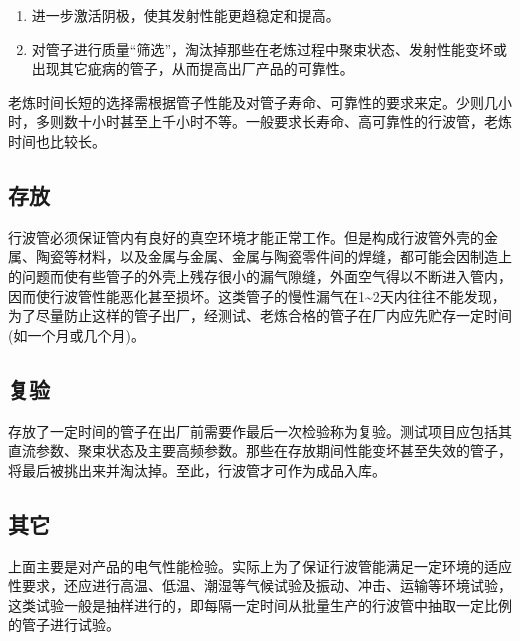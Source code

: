 \begin{enumerate}
	\item 进一步激活阴极，使其发射性能更趋稳定和提高。
	\item 对管子进行质量“筛选”，淘汰掉那些在老炼过程中聚束状态、发射性能变坏或出现其它疵病的管子，从而提高出厂产品的可靠性。
\end{enumerate}

老炼时间长短的选择需根据管子性能及对管子寿命、可靠性的要求来定。少则几小时，多则数十小时甚至上千小时不等。一般要求长寿命、高可靠性的行波管，老炼时间也比较长。
\subsection{存放}
行波管必须保证管内有良好的真空环境才能正常工作。但是构成行波管外壳的金属、陶瓷等材料，以及金属与金属、金属与陶瓷零件间的焊缝，都可能会因制造上的问题而使有些管子的外壳上残存很小的漏气隙缝，外面空气得以不断进入管内，因而使行波管性能恶化甚至损坏。这类管子的慢性漏气在1\textasciitilde2天内往往不能发现，为了尽量防止这样的管子出厂，经测试、老炼合格的管子在厂内应先贮存一定时间(如一个月或几个月)。

\subsection{复验}
存放了一定时间的管子在出厂前需要作最后一次检验称为复验。测试项目应包括其直流参数、聚束状态及主要高频参数。那些在存放期间性能变坏甚至失效的管子，将最后被挑出来并淘汰掉。至此，行波管才可作为成品入库。

\subsection{其它}
上面主要是对产品的电气性能检验。实际上为了保证行波管能满足一定环境的适应性要求，还应进行高温、低温、潮湿等气候试验及振动、冲击、运输等环境试验，这类试验一般是抽样进行的，即每隔一定时间从批量生产的行波管中抽取一定比例的管子进行试验。
